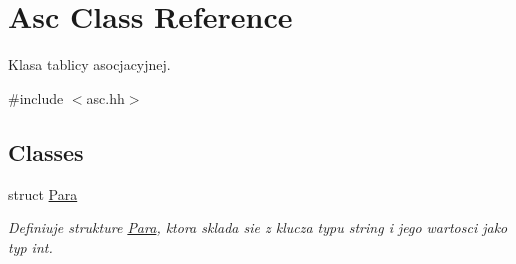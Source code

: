 \hypertarget{class_asc}{\section{\-Asc \-Class \-Reference}
\label{class_asc}
}


\-Klasa tablicy asocjacyjnej.  




{\ttfamily \#include $<$asc.\-hh$>$}

\subsection*{\-Classes}
\begin{DoxyCompactItemize}
\item 
struct \hyperlink{struct_asc_1_1_para}{\-Para}
\begin{DoxyCompactList}\small\item\em \-Definiuje strukture \hyperlink{struct_asc_1_1_para}{\-Para}, ktora sklada sie z klucza typu string i jego wartosci jako typ int. \end{DoxyCompactList}\end{DoxyCompactItemize}
